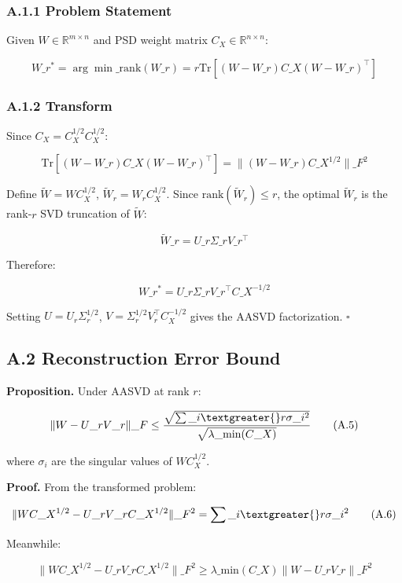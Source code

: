 \subsubsection{A.1.1 Problem Statement}

Given $W \in \mathbb{R}^{m \times n}$ and PSD weight matrix $C_X \in \mathbb{R}^{n \times n}$:

\[
W\_r^* = \arg\min\_{\text{rank}(W\_r) = r} \mathrm{Tr}\!\left[(W - W\_r) C\_X (W - W\_r)^\top\right]
\tag{A.1}
\]

\subsubsection{A.1.2 Transform}

Since $C_X = C_X^{1/2} C_X^{1/2}$:

\[
\mathrm{Tr}[(W - W\_r) C\_X (W - W\_r)^\top] = \|(W - W\_r) C\_X^{1/2}\|\_F^2
\tag{A.2}
\]

Define $\tilde{W} = W C_X^{1/2}$, $\tilde{W}_r = W_r C_X^{1/2}$. Since 
$\text{rank}(\tilde{W}_r) \leq r$, the optimal $\tilde{W}_r$ is the rank-$r$ 
SVD truncation of $\tilde{W}$:

\[
\tilde{W}\_r = U\_r \Sigma\_r V\_r^\top
\tag{A.3}
\]

Therefore:

\[
W\_r^* = U\_r \Sigma\_r V\_r^\top C\_X^{-1/2}
\tag{A.4}
\]

Setting $U = U_r \Sigma_r^{1/2}$, $V = \Sigma_r^{1/2} V_r^\top C_X^{-1/2}$ 
gives the AASVD factorization. $\square$

\subsection{A.2 Reconstruction Error Bound}

\textbf{Proposition.} Under AASVD at rank $r$:

\[
\|W - U\_r V\_r\|\_F \leq \frac{\sqrt{\sum\_{i \textgreater{} r} \sigma\_i^2}}{\sqrt{\lambda\_\text{min}(C\_X)}}
\tag{A.5}
\]

where $\sigma_i$ are the singular values of $W C_X^{1/2}$.

\textbf{Proof.} From the transformed problem:

\[
\|W C\_X^{1/2} - U\_r V\_r C\_X^{1/2}\|\_F^2 = \sum\_{i \textgreater{} r} \sigma\_i^2
\tag{A.6}
\]

Meanwhile:

\[
\|W C\_X^{1/2} - U\_r V\_r C\_X^{1/2}\|\_F^2 \geq \lambda\_\text{min}(C\_X) \|W - U\_r V\_r\|\_F^2
\tag{A.7}
\]


